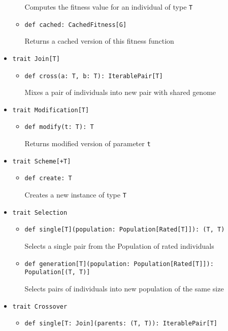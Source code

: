 \begin{itemize}
\begin{itemize}
	Computes the fitness value for an individual of type \texttt{T}

	\item \texttt{def cached: CachedFitness[G]}

	Returns a cached version of this fitness function
\end{itemize}

\smallskip
\item \texttt{trait Join[T]}
\begin{itemize}
	\item \texttt{def cross(a: T, b: T): IterablePair[T]}

	Mixes a pair of individuals into new pair with shared genome
\end{itemize}

\smallskip
\item \texttt{trait Modification[T]}
\begin{itemize}
	\item \texttt{def modify(t: T): T}

	Returns modified version of parameter \texttt{t}
\end{itemize}

\smallskip
\item \texttt{trait Scheme[+T]}
\begin{itemize}
	\item \texttt{def create: T}

	Creates a new instance of type \texttt{T}
\end{itemize}

\smallskip
\item \texttt{trait Selection}
\begin{itemize}
	\item \texttt{def single[T](population: Population[Rated[T]]): (T, T)}

	Selects a single pair from the Population of rated individuals 

	\item \texttt{def generation[T](population: Population[Rated[T]]): Population[(T, T)]}

	Selects pairs of individuals into new population of the same size
\end{itemize}

\smallskip
\item \texttt{trait Crossover}
\begin{itemize}
	\item \texttt{def single[T: Join](parents: (T, T)): IterablePair[T]}


\end{itemize}
\end{itemize}
